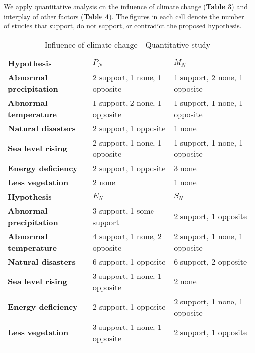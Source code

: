 \documentclass{mcmthesis}
\newlength\savedwidth
\newcommand\whline{\noalign{\global\savedwidth\arrayrulewidth
		\global\arrayrulewidth 1.2pt}%
	\hline
	\noalign{\global\arrayrulewidth\savedwidth}}
\newlength\savewidth
\newcommand\shline{\noalign{\global\savewidth\arrayrulewidth
		\global\arrayrulewidth 1.2pt}%
	\hline
	\noalign{\global\arrayrulewidth\savewidth}}
\begin{document}
	We apply quantitative analysis on the influence of climate change (\textbf{Table 3}) and interplay of other factors (\textbf{Table 4}). The figures in each cell denote the number of studies that support, do not support, or contradict the proposed hypothesis. 
	\begin{table}[htbp]
		\renewcommand\arraystretch{1.5}
		\footnotesize
		\centering
		\begin{tabular}{m{3.8cm}<{\centering}|m{4.8cm}<{\centering}|m{4.8cm}<{\centering}}
			\whline
			\textbf{Hypothesis}&\textbf{$P_N$}&\textbf{$M_N$}\\
			\whline
			\textbf{Abnormal precipitation}& 2 support, 1 none, 1 opposite &1 support, 2 none, 1 opposite\\
			
			\textbf{Abnormal temperature}&1 support, 2 none, 1 opposite&1 support, 1 none, 1 opposite\\
			
			\textbf{Natural disasters}&2 support, 1 opposite&1 none\\
			
			\textbf{Sea level rising}&2 support, 1 none, 1 opposite&1 support, 1 none, 1 opposite\\
			
			\textbf{Energy deficiency}&2 support, 1 opposite&3 none\\
			
			\textbf{Less vegetation}&2 none&1 none\\
			
			\shline
			\textbf{Hypothesis}&\textbf{$E_N$}&\textbf{$S_N$}\\
			\whline
			\textbf{Abnormal precipitation}& 3 support, 1 some support &2 support, 1 opposite\\
			
			\textbf{Abnormal temperature}&4 support, 1 none, 2 opposite&2 support, 1 none, 1 opposite\\
			
			\textbf{Natural disasters}&6 support, 1 opposite&6 support, 2 opposite\\
			
			\textbf{Sea level rising}&3 support, 1 none, 1 opposite&2 none\\
			
			\textbf{Energy deficiency}&2 support, 1 opposite&2 support, 1 none, 1 opposite\\
			
			\textbf{Less vegetation}&3 support, 1 none, 1 opposite&2 support, 1 opposite\\
			\shline
		\end{tabular}
		\caption{Influence of climate change - Quantitative study}\label{tab:Influence of climate change - Quantitative study}
	\end{table}
	
\end{document}
